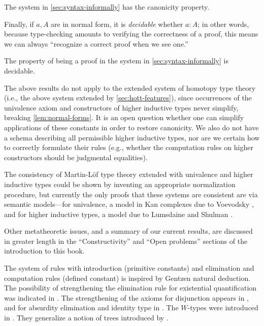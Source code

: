\begin{cor}
 The system in \autoref{sec:syntax-informally} has the canonicity property.
\end{cor}

Finally, if $a,A$ are in normal form, it is \emph{decidable} whether $a:A$; in
other words, because type-checking amounts to verifying the correctness of a
proof, this means we can always ``recognize a correct proof when we see one.''

\begin{cor}
The property of being a proof in the system in \autoref{sec:syntax-informally} is decidable.
\end{cor}

\mentalpause

The above results do not apply to the extended system of homotopy type
theory (i.e., the above system extended by \autoref{sec:hott-features}), since
occurrences of the univalence axiom and constructors of higher inductive types
never simplify, breaking \autoref{lem:normal-forms}. It is an open question
whether one can simplify applications of these constants in order to restore
canonicity. We also do not have a schema describing all permissible higher
inductive types, nor are we certain how to correctly formulate their rules
(e.g., whether the computation rules on higher constructors should be judgmental
equalities).

The consistency of Martin-L\"{o}f type theory extended with univalence and higher
inductive types could be shown by inventing an appropriate normalization procedure, but currently
the only proofs that these systems are consistent are via semantic models---for
univalence, a model in Kan complexes due to Voevodsky \cite{klv:ssetmodel}, and
for higher inductive types, a model due to Lumsdaine and Shulman \cite{ls:hits}.

Other metatheoretic issues, and a summary of our current results, are discussed
in greater length in the ``Constructivity'' and ``Open problems'' sections of
the introduction to this book.

%

\sectionNotes\label{subsec:general-remarks}


The system of rules with introduction (primitive constants) and elimination
and computation rules (defined constant) is inspired by Gentzen natural
deduction. The possibility of strengthening the elimination rule for
existential quantification was indicated in \cite{howard:pat}. The
strengthening of the axioms for disjunction appears in \cite{Martin-Lof-1972},
and for absurdity elimination and identity type in \cite{Martin-Lof-1973}. The
$W$-types were introduced in \cite{Martin-Lof-1979}. They generalize a notion
of trees introduced by \cite{Tait-1968}.
%

